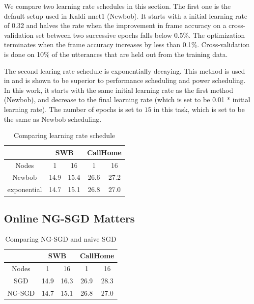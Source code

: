 \documentclass{article}
\begin{document}
We compare two learning rate schedules in this section. The first one is the default setup used in Kaldi nnet1 (Newbob). 
It starts with a initial learning rate of 0.32 and halves the rate when the improvement in frame accuracy on a cross-validation 
set between two successive epochs falls below 0.5\%. The optimization terminates when the frame accuracy increases by less 
than 0.1\%. Cross-validation is done on 10\% of the utterances that are held out from the training data.

The second learing rate schedule is exponentially decaying. This method is used in \cite{senior2013empirical,povey2014parallel} 
and is shown to be superior to performance scheduling and power scheduling. In this work, it starts with the same initial learning
rate as the first method (Newbob), and decrease to the final learning rate (which is set to be 0.01 * initial learning rate). The
number of epochs is set to $15$ in this task, which is set to be the same as Newbob scheduling.

\begin{table}
  \centering
  \begin{tabular}{c|c|c|c|c}
    \hline
    & \multicolumn{2}{c|}{SWB}  & \multicolumn{2}{c}{CallHome} \\
    \hline
    Nodes       &  1      & 16    &  1    & 16 \\
    \hline
    Newbob      & 14.9    & 15.4  & 26.6  & 27.2 \\
    \hline
    exponential & 14.7    & 15.1  & 26.8  & 27.0 \\
    \hline
  \end{tabular}
  \caption{Comparing learning rate schedule}
  \label{tab:init}
\end{table}

\subsection{Online NG-SGD Matters}
\begin{table}
  \centering
  \begin{tabular}{c|c|c|c|c}
    \hline
    & \multicolumn{2}{c|}{SWB}  & \multicolumn{2}{c}{CallHome} \\
    \hline
     Nodes  &  1    & 16        &   1   &  16 \\
    \hline
    SGD     & 14.9    & 16.3    &  26.9 & 28.3 \\
    \hline
    NG-SGD  & 14.7    & 15.1    &  26.8 & 27.0  \\
    \hline
  \end{tabular}
  \caption{Comparing NG-SGD and naive SGD}
  \label{tab:ngsgd}
\end{table}
\end{document}
